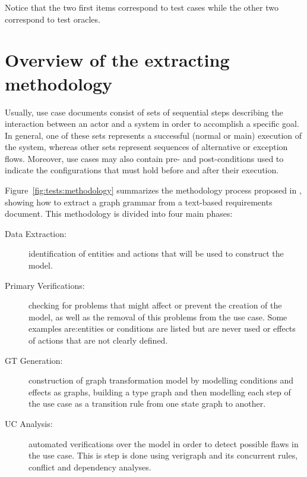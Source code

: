 Notice that the two first items correspond to test cases while the other two correspond to test oracles.


\section{Overview of the extracting methodology}

Usually, use case documents consist of sets of sequential steps describing the interaction between an actor and a system in order to accomplish a specific goal. In general, one of these sets represents a successful (normal or main) execution of the system, whereas other sets represent sequences of alternative or exception flows. Moreover, use cases may also contain pre- and post-conditions used to indicate the configurations that must hold before and after their execution.

Figure~\ref{fig:tests:methodology} summarizes the methodology process proposed in \cite{Junior2015}, showing how to extract a graph grammar from a text-based requirements document. This methodology is divided into four main phases:

\begin{description}
  \item[Data Extraction:] identification of entities and actions that will be used to construct the model.

  \item[Primary Verifications:] checking for problems that might affect or prevent the creation of the model, as well as the removal of this problems from the use case. Some examples are:entities or conditions are listed but are never used or effects of actions that are not clearly defined.

  \item[GT Generation:] construction of graph transformation model by modelling conditions and effects as graphs, building a type graph and then modelling each step of the use case as a transition rule from one state graph to another.

  \item[UC Analysis:] automated verifications over the model in order to detect possible flaws in the use case. This is step is done using verigraph and its concurrent rules, conflict and dependency analyses.
\end{description}

